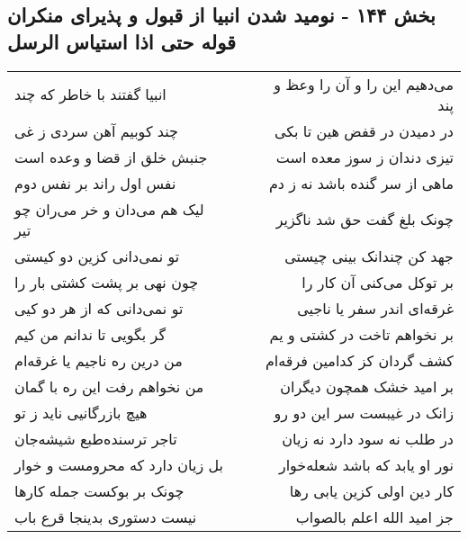 \begin{center}
\section*{بخش ۱۴۴ - نومید شدن انبیا از قبول و پذیرای منکران قوله حتی اذا استیاس الرسل}
\label{sec:sh144}
\begin{longtable}{l p{0.5cm} r}
انبیا گفتند با خاطر که چند
&&
می‌دهیم این را و آن را وعظ و پند
\\
چند کوبیم آهن سردی ز غی
&&
در دمیدن در قفض هین تا بکی
\\
جنبش خلق از قضا و وعده است
&&
تیزی دندان ز سوز معده است
\\
نفس اول راند بر نفس دوم
&&
ماهی از سر گنده باشد نه ز دم
\\
لیک هم می‌دان و خر می‌ران چو تیر
&&
چونک بلغ گفت حق شد ناگزیر
\\
تو نمی‌دانی کزین دو کیستی
&&
جهد کن چندانک بینی چیستی
\\
چون نهی بر پشت کشتی بار را
&&
بر توکل می‌کنی آن کار را
\\
تو نمی‌دانی که از هر دو کیی
&&
غرقه‌ای اندر سفر یا ناجیی
\\
گر بگویی تا ندانم من کیم
&&
بر نخواهم تاخت در کشتی و یم
\\
من درین ره ناجیم یا غرقه‌ام
&&
کشف گردان کز کدامین فرقه‌ام
\\
من نخواهم رفت این ره با گمان
&&
بر امید خشک همچون دیگران
\\
هیچ بازرگانیی ناید ز تو
&&
زانک در غیبست سر این دو رو
\\
تاجر ترسنده‌طبع شیشه‌جان
&&
در طلب نه سود دارد نه زیان
\\
بل زیان دارد که محرومست و خوار
&&
نور او یابد که باشد شعله‌خوار
\\
چونک بر بوکست جمله کارها
&&
کار دین اولی کزین یابی رها
\\
نیست دستوری بدینجا قرع باب
&&
جز امید الله اعلم بالصواب
\\
\end{longtable}
\end{center}

